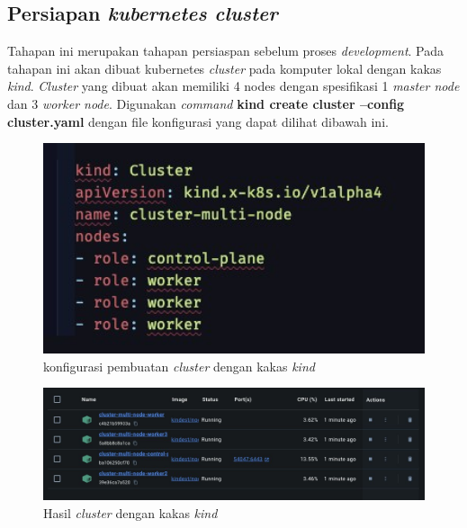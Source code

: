 \subsection{Persiapan \textit{kubernetes cluster}}

Tahapan ini merupakan tahapan persiaspan sebelum proses \textit{development}. Pada tahapan ini akan dibuat kubernetes \textit{cluster} pada komputer lokal dengan kakas \textit{kind}. \textit{Cluster} yang dibuat akan memiliki 4 nodes dengan spesifikasi 1 \textit{master node} dan 3 \textit{worker node}. Digunakan \textit{command} \textbf{kind create cluster --config cluster.yaml} dengan file konfigurasi yang dapat dilihat dibawah ini.

\begin{figure}[h]
  \centering
  \includegraphics[width=1\textwidth]{resources/appendix/pembuatan-cluster.jpg}
  \caption{konfigurasi pembuatan \textit{cluster} dengan kakas \textit{kind}}
  \label{fig:konfigurasi-pembuatan-cluster}
\end{figure}

\begin{figure}[h]
  \centering
  \includegraphics[width=1\textwidth]{resources/chapter-4/cluster-kind.jpg}
  \caption{Hasil \textit{cluster} dengan kakas \textit{kind}}
  \label{fig:hasil-cluster-kind}
\end{figure}

\pagebreak